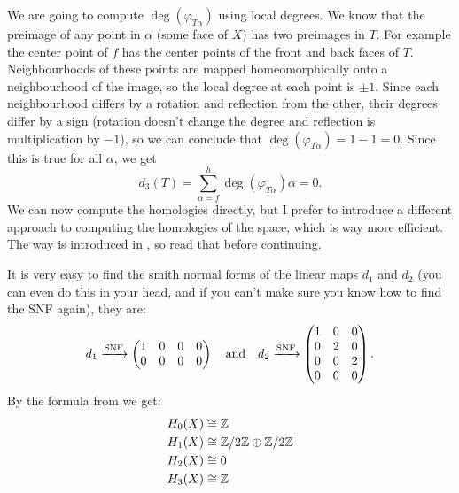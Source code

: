 \documentclass[11pt,a4paper]{article}
\begin{document}
\begin{solution}
\[  \]
  We are going to compute $\deg(\varphi_{T \alpha})$ using local degrees.
  We know that the preimage of any point in $\alpha$ (some face of $X$)
  has two preimages in $T$.
  For example the center point of $f$ has the center points of the
  front and back faces of $T$.
  Neighbourhoods of these points are mapped homeomorphically onto a
  neighbourhood of the image, so the local degree at each point is $\pm 1$.
  Since each neighbourhood differs by a rotation and reflection from the
  other, their degrees differ by a sign (rotation doesn't change the
  degree and reflection is multiplication by $-1$),
  so we can conclude that $\deg(\varphi_{T \alpha}) = 1 - 1 = 0$.
  Since this is true for all $\alpha$, we get
  \[
    d_3(T) = \sum_{\alpha = f}^{h} \deg(\varphi_{T \alpha}) \alpha = 0. 
  \]
  We can now compute the homologies directly,
  but I prefer to introduce a different approach to computing the homologies
  of the space, which is way more efficient.
  The way is introduced in ,
  so read that before continuing.

  It is very easy to
  find the smith normal forms of the linear maps
  $d_1$ and $d_2$ (you can even do this in your head, and if you can't
  make sure you know how to find the SNF again),
  they are:
  \[
    d_1 \xrightarrow{\text{SNF}}
    \begin{pmatrix}
      1 & 0 & 0 & 0 \\
      0 & 0 & 0 & 0
    \end{pmatrix}
    \quad \text{and} \quad
    d_2 \xrightarrow{\text{SNF}}
    \begin{pmatrix}
      1 & 0 & 0 \\
      0 & 2 & 0 \\
      0 & 0 & 2 \\
      0 & 0 & 0
    \end{pmatrix}.
  \]
  By the formula from  we get:
  \begin{align*}
    &H_0(X) \cong \mathbb{Z} \\
    &H_1(X) \cong \mathbb{Z}/2\mathbb{Z} \oplus \mathbb{Z}/2\mathbb{Z} \\
    &H_2(X) \cong 0 \\
    &H_3(X) \cong \mathbb{Z}
  \end{align*}
\end{solution}
\end{document}

